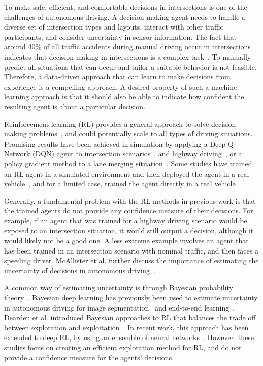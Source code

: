To make safe, efficient, and comfortable decisions in intersections is one of the challenges of autonomous driving. 
A decision-making agent needs to handle a diverse set of intersection types and layouts, interact with other traffic participants, and consider uncertainty in sensor information. 
The fact that around 40\% of all traffic accidents during manual driving occur in intersections indicates that decision-making in intersections is a complex task~\cite{NHTSA}.
To manually predict all situations that can occur and tailor a suitable behavior is not feasible. Therefore, a data-driven approach that can learn to make decisions from experience is a compelling approach. A desired property of such a machine learning approach is that it should also be able to indicate how confident the resulting agent is about a particular decision.

Reinforcement learning (RL) provides a general approach to solve decision-making problems~\cite{Sutton2018}, and could potentially scale to all types of driving situations. Promising results have been achieved in simulation by applying a Deep Q-Network (DQN) agent to intersection scenarios~\cite{Isele2018,Tram2018}, and highway driving~\cite{Wang2018,Hoel2018}, or a policy gradient method to a lane merging situation~\cite{Shalev2016}. Some studies have trained an RL agent in a simulated environment and then deployed the agent in a real vehicle~\cite{Pan2017, Bansal2018}, and for a limited case, trained the agent directly in a real vehicle~\cite{Kendall2017}.

Generally, a fundamental problem with the RL methods in previous work is that the trained agents do not provide any confidence measure of their decisions.
For example, if an agent that was trained for a highway driving scenario would be exposed to an intersection situation, it would still output a decision, although it would likely not be a good one. A less extreme example involves an agent that has been trained in an intersection scenario with nominal traffic, and then faces a speeding driver. 
McAllister et al. further discuss the importance of estimating the uncertainty of decisions in autonomous driving~\cite{McAllister2017}.

A common way of estimating uncertainty is through Bayesian probability theory~\cite{Kochenderfer2015}. Bayesian deep learning has previously been used to estimate uncertainty in autonomous driving for image segmentation~\cite{Kendall2017} and end-to-end learning~\cite{Michelmore2018}. Dearden et al. introduced Bayesian approaches to RL that balances the trade off between exploration and exploitation~\cite{Dearden1998}. In recent work, this approach has been extended to deep RL, by using an ensemble of neural networks~\cite{Osband2018}. However, these studies focus on creating an efficient exploration method for RL, and do not provide a confidence measure for the agents' decisions.

